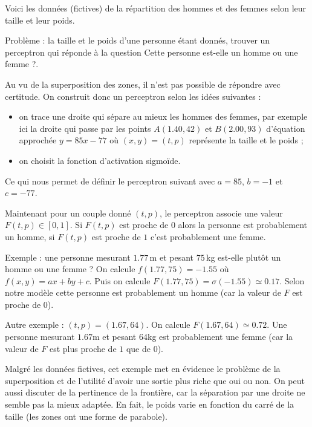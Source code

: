 \begin{exemple}{}{}
	Voici les données (fictives) de la répartition des hommes et des femmes selon leur taille et leur poids.
	
	
	
	Problème : la taille et le poids d'une personne étant donnés, trouver un perceptron qui réponde à la question \og{}Cette personne est-elle un homme ou une femme ?\fg{}.
	
	Au vu de la superposition des zones, il n'est pas possible de répondre avec certitude.  On construit donc un perceptron selon les idées suivantes :
	\begin{itemize}
		\item on trace une droite qui sépare au mieux les hommes des femmes, par exemple ici la droite qui passe par les points $A(1.40,42)$ et $B(2.00,93)$ d'équation approchée $y=85x-77$ où $(x,y)=(t,p)$ représente la taille et le poids ;
		
		\item on choisit la fonction d'activation sigmoïde.
	\end{itemize}
	Ce qui nous permet de définir le perceptron suivant avec $a=85$, $b=-1$ et $c=-77$.
	
	\begin{center}
		\begin{minipage}{0.35\textwidth}
		\end{minipage}
		\begin{minipage}{0.45\textwidth}
		\end{minipage}
	\end{center}
	
	Maintenant pour un couple donné $(t,p)$, le perceptron associe une valeur $F(t,p) \in [0,1]$.
	Si $F(t,p)$ est proche de $0$ alors la personne est probablement un homme, si $F(t,p)$ est proche de $1$ c'est probablement une femme.
	
	
	Exemple : une personne mesurant $1.77$\,m et pesant $75$\,kg est-elle plutôt un homme ou une femme ? On calcule $f(1.77,75)=-1.55$ où $f(x,y)=ax+by+c$.
	Puis on calcule $F(1.77,75) = \sigma(-1.55) \simeq 0.17$. Selon notre modèle cette personne est probablement un homme (car la valeur de $F$ est proche de $0$).
	
	Autre exemple : $(t,p)=(1.67,64)$. On calcule $F(1.67,64) \simeq 0.72$.
	Une personne mesurant $1.67$m et pesant $64$kg est probablement une femme (car la valeur de $F$ est plus proche de $1$ que de $0$).
	
	Malgré les données fictives, cet exemple met en évidence le problème de la superposition et de l'utilité d'avoir une sortie plus riche que  \og{}oui\fg{} ou \og{}non\fg{}. On peut aussi discuter de la pertinence de la frontière, car la séparation par une droite ne semble pas la mieux adaptée.  En fait, le poids varie en fonction du carré de la taille (les zones ont une forme de parabole). 
\end{exemple}




